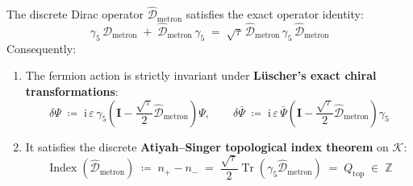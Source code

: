 \documentclass[
    12pt,
    a4paper,
    headings=normal,
    twoside=false,
    open=any,
    parskip=half
]{scrbook}
\newcommand{\iu}{\mathrm{i}}
\begin{document}
\begin{phystheorem}\label{thm:ch8_ginsparg_wilson_master}
The discrete Dirac operator $\hat{\mathcal{D}}_{\text{metron}}$ satisfies the exact operator identity:
\begin{equation}
\boxed{\gamma_5 \, \hat{\mathcal{D}}_{\text{metron}} \;+\; \hat{\mathcal{D}}_{\text{metron}} \, \gamma_5 \;=\; \sqrt{\tau} \, \hat{\mathcal{D}}_{\text{metron}} \, \gamma_5 \, \hat{\mathcal{D}}_{\text{metron}}}
\label{eq:ch8_ginsparg_wilson_master}
\end{equation}
Consequently:
\begin{enumerate}[label=(\alph*), noitemsep]
    \item The fermion action is strictly invariant under \textbf{Lüscher's exact chiral transformations}:
    \begin{equation}
    \delta \Psi \;\coloneqq\; \iu \, \varepsilon \, \gamma_5 \left( \mathbf{I} - \frac{\sqrt{\tau}}{2} \hat{\mathcal{D}}_{\text{metron}} \right) \Psi, \qquad \delta \bar{\Psi} \;\coloneqq\; \iu \, \varepsilon \, \bar{\Psi} \left( \mathbf{I} - \frac{\sqrt{\tau}}{2} \hat{\mathcal{D}}_{\text{metron}} \right) \gamma_5
    \label{eq:ch8_luescher_transformation}
    \end{equation}
    \item It satisfies the discrete \textbf{Atiyah--Singer topological index theorem} on $\mathcal{K}$:
    \begin{equation}
    \operatorname{Index}\left( \hat{\mathcal{D}}_{\text{metron}} \right) \;\coloneqq\; n_+ - n_- \;=\; \frac{\sqrt{\tau}}{2} \operatorname{Tr}\left( \gamma_5 \hat{\mathcal{D}}_{\text{metron}} \right) \;=\; Q_{\text{top}} \;\in\; \mathbb{Z}
    \label{eq:ch8_atiyah_singer_index}
    \end{equation}
\end{enumerate}
\end{phystheorem}
\end{document}
